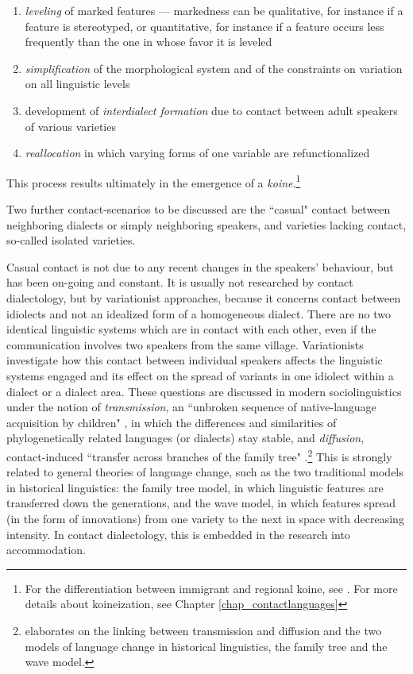 \documentclass[output=paper]{langscibook}
\begin{document}
\begin{enumerate}
    \item \textit{leveling} of marked features --- markedness can be qualitative, for instance if a feature is stereotyped, or quantitative, for instance if a feature occurs less frequently than the one in whose favor it is leveled
    \item \textit{simplification} of the morphological system and of the constraints on variation on all linguistic levels
    \item development of \textit{interdialect formation} due to contact between adult speakers of various varieties
    \item \textit{reallocation} in which varying forms of one variable are refunctionalized
\end{enumerate}
This process results ultimately in the emergence of a \textit{koine}.\footnote{For the differentiation between immigrant and regional koine, see \textcite[175f.]{Siegel.2001}. For more details about koineization, see Chapter \ref{chap_contactlanguages}} 

Two further contact-scenarios to be discussed are the “casual" contact between neighboring dialects or simply neighboring speakers, and varieties lacking contact, so-called isolated varieties.

Casual contact is not due to any recent changes in the speakers' behaviour, but has been on-going and constant. It is usually not researched by contact dialectology, but by variationist approaches, because it concerns contact between idiolects and not an idealized form of a homogeneous dialect. There are no two identical linguistic systems which are in contact with each other, even if the communication involves two speakers from the same village. Variationists investigate how this contact between individual speakers affects the linguistic systems engaged and its effect on the spread of variants in one idiolect within a dialect or a dialect area. These questions are discussed in modern sociolinguistics under the notion of \textit{transmission}, an “unbroken sequence of native-language acquisition by children" \parencite[346]{Labov.2007}, in which the differences and similarities of phylogenetically related languages (or dialects) stay stable, and \textit{diffusion}, contact-induced “transfer across branches of the family tree" \parencite[347]{Labov.2007}.\footnote{\textcite{Labov.2007} elaborates on the linking between transmission and diffusion and the two models of language change in historical linguistics, the family tree and the wave model.} This is strongly related to general theories of language change, such as the two traditional models in historical linguistics: the family tree model, in which linguistic features are transferred down the generations, and the wave model, in which features spread (in the form of innovations) from one variety to the next in space with decreasing intensity. In contact dialectology, this is embedded in the research into accommodation. 
\end{document}
